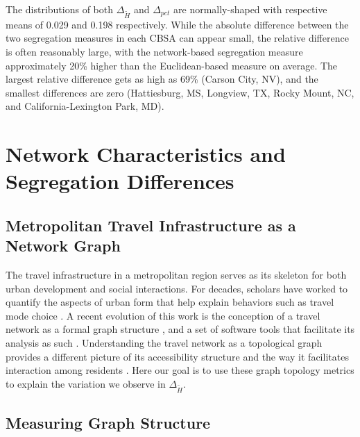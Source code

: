 \documentclass[
  10pt,
]{article}
\begin{document}
The distributions of both \(\Delta_{\tilde{H}}\) and \(\Delta_{pct}\)
are normally-shaped with respective means of 0.029 and 0.198
respectively. While the absolute difference between the two segregation
measures in each CBSA can appear small, the relative difference is often
reasonably large, with the network-based segregation measure
approximately 20\% higher than the Euclidean-based measure on average.
The largest relative difference gets as high as 69\% (Carson City, NV),
and the smallest differences are zero (Hattiesburg, MS, Longview, TX,
Rocky Mount, NC, and California-Lexington Park, MD).

\hypertarget{network-characteristics-and-segregation-differences}{%
\section{Network Characteristics and Segregation
Differences}\label{network-characteristics-and-segregation-differences}}

\hypertarget{metropolitan-travel-infrastructure-as-a-network-graph}{%
\subsection{Metropolitan Travel Infrastructure as a Network
Graph}\label{metropolitan-travel-infrastructure-as-a-network-graph}}

The travel infrastructure in a metropolitan region serves as its
skeleton for both urban development and social interactions. For
decades, scholars have worked to quantify the aspects of urban form that
help explain behaviors such as travel mode choice
\citep[\citet{ewing2010TravelBuilt}]{crane2000InfluenceUrban, clifton2008QuantitativeAnalysis, ewing2009MeasuringUnmeasurable}.
A recent evolution of this work is the conception of a travel network as
a formal graph structure
\citep{boeing2018PlanarityStreet, boeing2018MorphologyCircuity, fleischmann2021MethodologicalFoundation, fleischmann2018MeasuringUrban, araldi2019StreetMetropolitan, dibble2019OriginSpaces},
and a set of software tools that facilitate its analysis as such
\citep{boeing2016OSMnxNew, fleischmann2019MomepyUrban}. Understanding
the travel network as a topological graph provides a different picture
of its accessibility structure and the way it facilitates interaction
among residents \citep{levinson2017ElementsAccess}. Here our goal is to
use these graph topology metrics to explain the variation we observe in
\(\Delta_{\tilde{H}}\).

\hypertarget{measuring-graph-structure}{%
\subsection{Measuring Graph Structure}\label{measuring-graph-structure}}
\end{document}
